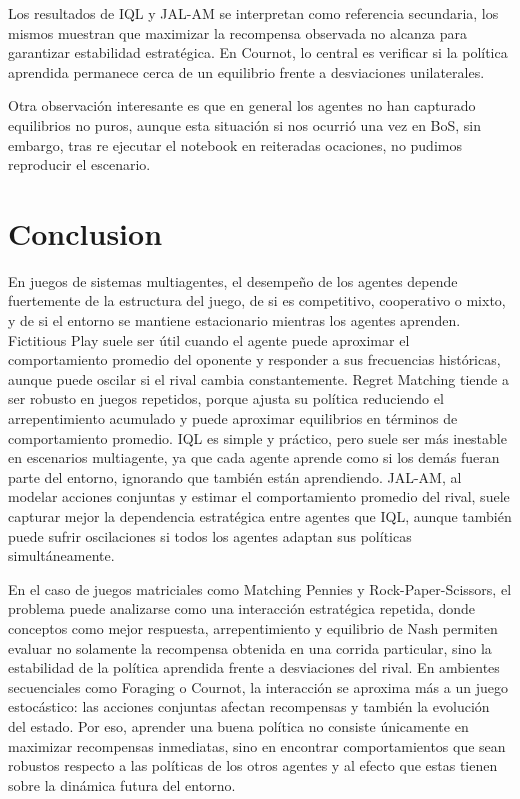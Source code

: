 \documentclass[letterpaper,12pt]{article} %
\begin{document}
Los resultados de IQL y JAL-AM se interpretan como referencia secundaria, los mismos muestran que maximizar la recompensa observada no alcanza para garantizar estabilidad estratégica. En Cournot, lo central es verificar si la política aprendida permanece cerca de un equilibrio frente a desviaciones unilaterales.

Otra observación interesante es que en general los agentes no han capturado equilibrios no puros, aunque esta situación si nos ocurrió una vez en BoS, sin embargo, tras re ejecutar el notebook en reiteradas ocaciones, no pudimos reproducir el escenario.

\clearpage
\section{Conclusion}

En juegos de sistemas multiagentes, el desempeño de los agentes depende fuertemente de la estructura del juego, de si es competitivo, cooperativo o mixto, y de si el entorno se mantiene estacionario mientras los agentes aprenden. Fictitious Play suele ser útil cuando el agente puede aproximar el comportamiento promedio del oponente y responder a sus frecuencias históricas, aunque puede oscilar si el rival cambia constantemente. Regret Matching tiende a ser robusto en juegos repetidos, porque ajusta su política reduciendo el arrepentimiento acumulado y puede aproximar equilibrios en términos de comportamiento promedio. IQL es simple y práctico, pero suele ser más inestable en escenarios multiagente, ya que cada agente aprende como si los demás fueran parte del entorno, ignorando que también están aprendiendo. JAL-AM, al modelar acciones conjuntas y estimar el comportamiento promedio del rival, suele capturar mejor la dependencia estratégica entre agentes que IQL, aunque también puede sufrir oscilaciones si todos los agentes adaptan sus políticas simultáneamente.

En el caso de juegos matriciales como Matching Pennies y Rock-Paper-Scissors, el problema puede analizarse como una interacción estratégica repetida, donde conceptos como mejor respuesta, arrepentimiento y equilibrio de Nash permiten evaluar no solamente la recompensa obtenida en una corrida particular, sino la estabilidad de la política aprendida frente a desviaciones del rival. En ambientes secuenciales como Foraging o Cournot, la interacción se aproxima más a un juego estocástico: las acciones conjuntas afectan recompensas y también la evolución del estado. Por eso, aprender una buena política no consiste únicamente en maximizar recompensas inmediatas, sino en encontrar comportamientos que sean robustos respecto a las políticas de los otros agentes y al efecto que estas tienen sobre la dinámica futura del entorno.
\end{document}

